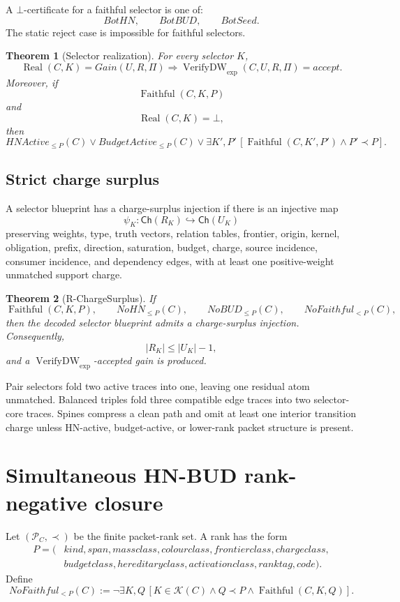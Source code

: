 \documentclass[10.5pt,a4paper]{article}
\newtheorem{theorem}{Theorem}[section]
\newcommand{\Ch}{\mathsf{Ch}}
\newcommand{\Real}{\operatorname{Real}}
\newcommand{\VerifyDW}{\operatorname{VerifyDW}_{\exp}}
\newcommand{\Faithful}{\operatorname{Faithful}}
\newcommand{\Bot}{\bot}
\begin{document}
A \(\Bot\)-certificate for a faithful selector is one of:
\[
BotHN,
\qquad BotBUD,
\qquad BotSeed.
\]
The static reject case is impossible for faithful selectors.

\begin{theorem}[Selector realization]
For every selector \(K\),
\[
\Real(C,K)=Gain(U,R,\Pi)\Longrightarrow \VerifyDW(C,U,R,\Pi)=accept.
\]
Moreover, if
\[
\Faithful(C,K,P)
\]
and
\[
\Real(C,K)=\Bot,
\]
then
\[
HNActive_{\le P}(C)
\vee
BudgetActive_{\le P}(C)
\vee
\exists K',P'\,[\Faithful(C,K',P')\wedge P'\prec P].
\]
\end{theorem}

\subsection{Strict charge surplus}
A selector blueprint has a charge-surplus injection if there is an injective map
\[
\psi_K:\Ch(R_K)\hookrightarrow\Ch(U_K)
\]
preserving weights, type, truth vectors, relation tables, frontier, origin, kernel, obligation, prefix, direction, saturation, budget, charge, source incidence, consumer incidence, and dependency edges, with at least one positive-weight unmatched support charge.

\begin{theorem}[R-ChargeSurplus]
If
\[
\Faithful(C,K,P),\qquad NoHN_{\le P}(C),\qquad NoBUD_{\le P}(C),\qquad NoFaithful_{<P}(C),
\]
then the decoded selector blueprint admits a charge-surplus injection. Consequently,
\[
|R_K|\le |U_K|-1,
\]
and a \(\VerifyDW\)-accepted gain is produced.
\end{theorem}

Pair selectors fold two active traces into one, leaving one residual atom unmatched. Balanced triples fold three compatible edge traces into two selector-core traces. Spines compress a clean path and omit at least one interior transition charge unless HN-active, budget-active, or lower-rank packet structure is present.

\section{Simultaneous HN-BUD rank-negative closure}

Let \((\mathcal P_C,\prec)\) be the finite packet-rank set. A rank has the form
\[
\begin{aligned}
P=(&kind,span,massclass,colourclass,frontierclass,chargeclass,\\
&budgetclass,hereditaryclass,activationclass,ranktag,code).
\end{aligned}
\]
Define
\[
NoFaithful_{<P}(C):=\neg\exists K,Q\,[K\in\mathcal K(C)\wedge Q\prec P\wedge \Faithful(C,K,Q)].
\]
\end{document}
